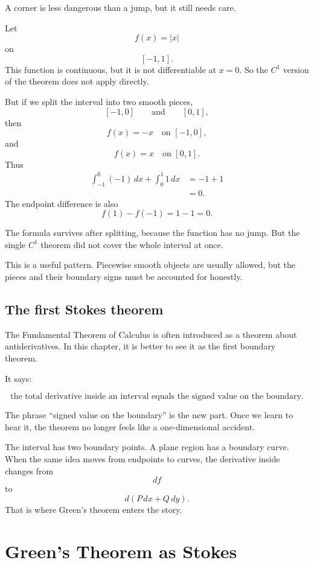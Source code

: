 A corner is less dangerous than a jump, but it still needs care.

\begin{example}
Let
\[
    f(x)=|x|
\]
on
\[
    [-1,1].
\]
This function is continuous, but it is not differentiable at \(x=0\).  So the \(C^1\)
version of the theorem does not apply directly.

But if we split the interval into two smooth pieces,
\[
    [-1,0]
    \qquad\text{and}\qquad
    [0,1],
\]
then
\[
    f(x)=-x
    \quad\text{on }[-1,0],
\]
and
\[
    f(x)=x
    \quad\text{on }[0,1].
\]
Thus
\[
\begin{aligned}
    \int_{-1}^{0}(-1)\,dx+\int_0^1 1\,dx
    &=
    -1+1\\
    &=
    0.
\end{aligned}
\]
The endpoint difference is also
\[
    f(1)-f(-1)=1-1=0.
\]

The formula survives after splitting, because the function has no jump.  But the
single \(C^1\) theorem did not cover the whole interval at once.
\end{example}

This is a useful pattern.  Piecewise smooth objects are usually allowed, but the pieces
and their boundary signs must be accounted for honestly.

\subsection{The first Stokes theorem}

The Fundamental Theorem of Calculus is often introduced as a theorem about
antiderivatives.  In this chapter, it is better to see it as the first boundary theorem.

It says:

\[
\boxed{
    \text{the total derivative inside an interval equals the signed value on the boundary.}
}
\]

The phrase ``signed value on the boundary'' is the new part.  Once we learn to hear it,
the theorem no longer feels like a one-dimensional accident.

The interval has two boundary points.  A plane region has a boundary curve.  When the
same idea moves from endpoints to curves, the derivative inside changes from
\[
    df
\]
to
\[
    d(P\,dx+Q\,dy).
\]
That is where Green's theorem enters the story.

\section{Green's Theorem as Stokes}
\label{sec:18.4}

